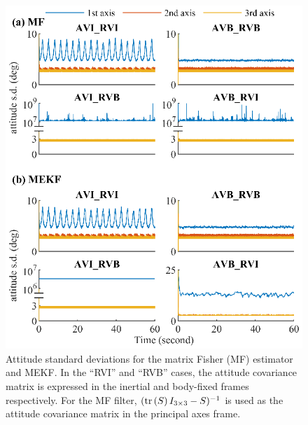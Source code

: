 \begin{figure}
	\centering
	\includegraphics[scale=1.4]{figures/observability/attitudeStd}
	\caption{Attitude standard deviations for the matrix Fisher (MF) estimator and MEKF.
		In the ``RVI'' and ``RVB'' cases, the attitude covariance matrix is expressed in the inertial and body-fixed frames respectively.
		For the MF filter, $(\mathrm{tr}\left( S \right)I_{3\times 3}-S)^{-1}$ is used as the attitude covariance matrix in the principal axes frame. \label{fig:observability-attitudeStd}}
\end{figure}

